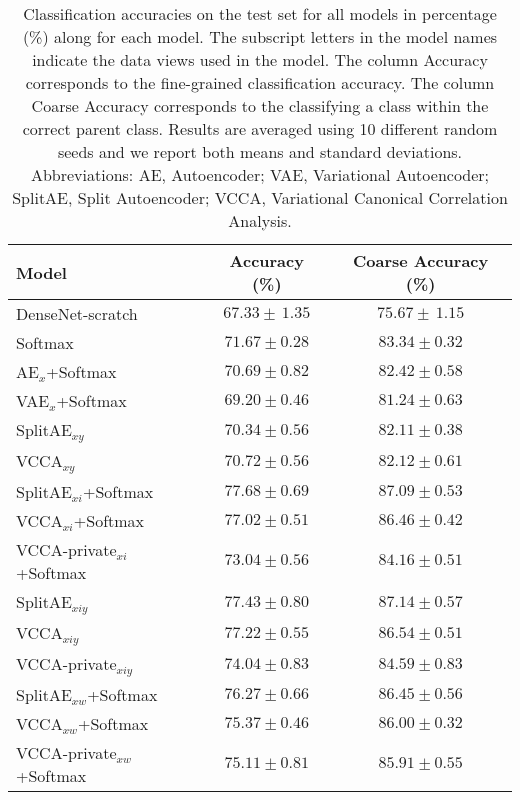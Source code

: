 
\renewcommand{\arraystretch}{1.05}
\begin{table}[th!]
\centering
\caption{Classification accuracies on the test set for all models in percentage (\%) along for each model. The subscript letters in the model names indicate the data views used in the model. The column Accuracy corresponds to the fine-grained classification accuracy. The column Coarse Accuracy corresponds to the classifying a class within the correct parent class. Results are averaged using 10 different random seeds and we report both means and standard deviations. Abbreviations: AE, Autoencoder; VAE, Variational Autoencoder; SplitAE, Split Autoencoder; VCCA, Variational Canonical Correlation Analysis.
}
\begin{tabular}{l c c} 
    \hline 
    Model & Accuracy (\%) & Coarse Accuracy (\%) \\ 
    \hline
    DenseNet-scratch & $67.33 \pm \, 1.35$ & $75.67 \pm \, 1.15$ \\ 
    \rowcolor{gray!30}
    Softmax & $71.67 \pm 0.28$ & $83.34 \pm 0.32$ \\ 
    \hline
    AE$_{x}$+Softmax & $70.69 \pm 0.82$ & $82.42 \pm 0.58$ \\ 
    \rowcolor{gray!30}
    VAE$_{x}$+Softmax & $69.20 \pm 0.46$ & $81.24 \pm 0.63$ \\ 
    \hline
    SplitAE$_{x y}$ & $70.34 \pm 0.56$ & $82.11 \pm 0.38$ \\ 
    \rowcolor{gray!30}   
    VCCA$_{x y}$ & $70.72 \pm 0.56$ & $82.12 \pm 0.61$ \\ 
    \hline
    SplitAE$_{x i}$+Softmax & $77.68 \pm 0.69$ & $87.09 \pm 0.53$ \\ 
    \rowcolor{gray!30}  
    VCCA$_{x i}$+Softmax & $77.02 \pm 0.51$ & $86.46 \pm 0.42$ \\ 
    VCCA-private$_{x i}$+Softmax & $73.04 \pm 0.56$ & $84.16 \pm 0.51$ \\ \hline 
    \rowcolor{gray!30}
    SplitAE$_{x i y}$ & $77.43 \pm 0.80$ & $87.14 \pm 0.57$ \\ 
    VCCA$_{x i y}$ &  $77.22 \pm 0.55$ & $86.54 \pm 0.51$ \\ 
    \rowcolor{gray!30}  
    VCCA-private$_{x i y}$ & $74.04 \pm 0.83$ & $84.59 \pm 0.83$ \\
    \hline
    SplitAE$_{x w}$+Softmax & $76.27 \pm 0.66$ & $86.45 \pm 0.56$ \\
    \rowcolor{gray!30}  
    VCCA$_{x w}$+Softmax & $75.37 \pm 0.46$ & $86.00 \pm 0.32$\\
    VCCA-private$_{x w}$+Softmax & $75.11 \pm 0.81$ & $85.91 \pm 0.55$ \\ \hline

\end{tabular}
\end{table}
